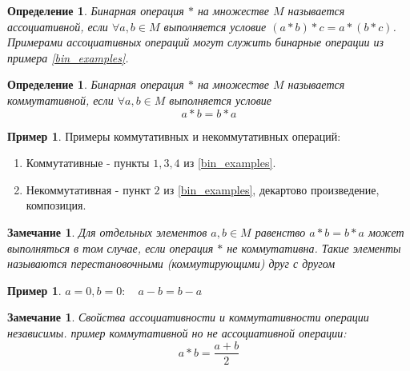 \documentclass[12pt,oneside]{article}
\newtheorem{determ}[theorem]{Определение}
\newtheorem{ffff}[theorem]{Замечание}
\theoremstyle{definition}
\newtheorem{example}[theorem]{Пример}
\begin{document}
\begin{determ}
	Бинарная операция $*$ на множестве $M$ называется ассоциативной, если $\forall a,b \in M$ выполняется условие $(a*b)*c = a*(b*c)$.\\
	Примерами ассоциативных операций могут служить бинарные операции из примера  \ref{bin_examples}.
\end{determ}

\begin{determ}
	Бинарная операция $*$ на множестве $M$ называется коммутативной, если $\forall a,b \in M$ выполняется условие
	\begin{equation}
		a*b=b*a
	\end{equation}
\end{determ}

\begin{example}
	Примеры коммутативных и некоммутативных операций:
	\begin{enumerate}
		\item Коммутативные - пункты $1, 3, 4$ из \ref{bin_examples}.
		\item Некоммутативная - пункт $2$ из \ref{bin_examples}, декартово произведение, композиция.
	\end{enumerate}
\end{example}

\begin{ffff}
	Для отдельных элементов $a,b \in M$ равенство $a*b=b*a$ может выполняться в том случае, если операция $*$ не коммутативна. Такие элементы называются перестановочными (коммутирующими) друг с другом
\end{ffff}

\begin{example}
	$a=0, b=0: \quad a-b=b-a$
\end{example}

\begin{ffff}
	Свойства ассоциативности и коммутативности операции независимы. пример коммутативной но не ассоциативной операции:
	\begin{equation}
	a*b=\frac{a+b}{2}
	\end{equation}
\end{ffff}
\end{document}
